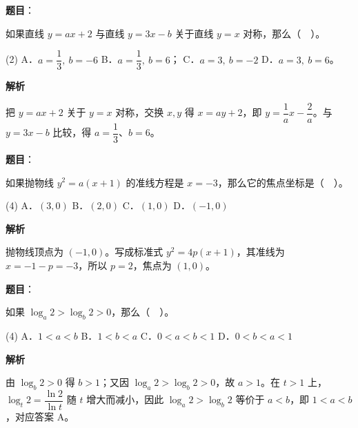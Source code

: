 \begin{answer}

\textbf{题目}：

如果直线 $y=ax+2$ 与直线 $y=3x-b$ 关于直线 $y=x$ 对称，那么（　）。

\begin{gkopts}(2)
\task A．$a=\dfrac13,\ b=-6$
\task B．$a=\dfrac13,\ b=6$；
\task C．$a=3,\ b=-2$
\task D．$a=3,\ b=6$。
\end{gkopts}

\textbf{解析}

把 $y=ax+2$ 关于 $y=x$ 对称，交换 $x,y$ 得 $x=ay+2$，即 $y=\dfrac1a x-\dfrac2a$。与 $y=3x-b$ 比较，得 $a=\dfrac13$、$b=6$。


\end{answer}
\begin{answer}

\textbf{题目}：

如果抛物线 $y^2=a(x+1)$ 的准线方程是 $x=-3$，那么它的焦点坐标是（　）。

\begin{gkopts}(4)
\task A．$(3,0)$
\task B．$(2,0)$
\task C．$(1,0)$
\task D．$(-1,0)$
\end{gkopts}

\textbf{解析}

抛物线顶点为 $(-1,0)$。写成标准式 $y^2=4p(x+1)$，其准线为 $x=-1-p=-3$，所以 $p=2$，焦点为 $(1,0)$。


\end{answer}
\begin{answer}

\textbf{题目}：

如果 $\log_a2>\log_b2>0$，那么（　）。

\begin{gkopts}(4)
\task A．$1<a<b$
\task B．$1<b<a$
\task C．$0<a<b<1$
\task D．$0<b<a<1$
\end{gkopts}

\textbf{解析}

由 $\log_b 2>0$ 得 $b>1$；又因 $\log_a 2>\log_b 2>0$，故 $a>1$。在 $t>1$ 上，$\log_t 2=\dfrac{\ln2}{\ln t}$ 随 $t$ 增大而减小，因此 $\log_a 2>\log_b 2$ 等价于 $a<b$，即 $1<a<b$，对应答案 A。


\end{answer}
